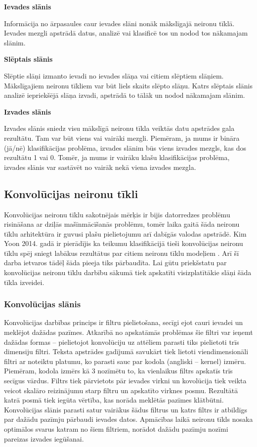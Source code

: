 \textbf{Ievades slānis}

Informācija no ārpasaules caur ievades slāni nonāk mākslīgajā neironu tīklā. Ievades mezgli apstrādā datus, analizē vai klasificē tos un nodod tos nākamajam slānim.

\textbf{Slēptais slānis}

Slēptie slāņi izmanto ievadi no ievades slāņa vai citiem slēptiem slāņiem. Mākslīgajiem neironu tīkliem var būt liels skaits slēpto slāņu. Katrs slēptais slānis analizē iepriekšējā slāņa izvadi, apstrādā to tālāk un nodod nākamajam slānim.

\textbf{Izvades slānis}

Izvades slānis sniedz visu mākslīgā neironu tīkla veiktās datu apstrādes gala rezultātu. Tam var būt viens vai vairāki mezgli. Piemēram, ja mums ir bināra (jā/nē) klasifikācijas problēma, izvades slānim būs viens izvades mezgls, kas dos rezultātu 1 vai 0. Tomēr, ja mums ir vairāku klašu klasifikācijas problēma, izvades slānis var sastāvēt no vairāk nekā viena izvades mezgla.

\subsection{Konvolūcijas neironu tīkli}
Konvolūcijas neironu tīklu sakotnējais mērķis ir bijis datorredzes problēmu risināšana ar dziļās mašīnmācīšanās problēmu, tomēr laika gaitā šāda neironu tīklu arhitektūra ir guvusi plašu pielietojumu arī dabīgās valodas apstrādē. Kim Yoon 2014. gadā ir pierādījis ka teikumu klasifikācijā tieši konvolūcijas neironu tīklu spēj sniegt labākus rezultātus par citiem neironu tīklu modeļiem \cite{kimYoonCNN}. Arī šī darba ietvaros tādēļ šāda pieeja tiks pārbaudīta. Lai gūtu priekšstatu par konvolūcijas neironu tīklu darbību sākumā tiek apskatīti visizplatītākie slāņi šāda tīkla izveidei.

\subsubsection{Konvolūcijas slānis}
Konvolūcijas darbības princips ir filtru pielietošana, secīgi ejot cauri ievadei un meklējot dažādas pazīmes. Atkarībā no apskatāmās problēmas šie filtri var ieņemt dažādas  formas – pielietojot konvolūciju uz attēliem parasti tiks pielietoti trīs dimensiju filtri. Teksta apstrādes gadījumā savukārt tiek lietoti viendimensionāli filtri ar noteiktu platumu, ko parasti sauc par kodola (angliski – kernel) izmēru. Piemēram, kodola izmērs kā 3 nozīmētu to, ka vienlaikus filtrs apskatīs trīs secīgus vārdus. Filtrs tiek pārvietots pār ievades virkni un kovolūcija tiek veikta veicot skalāro reizinājumu starp filtru un apskatīto virknes posmu. Rezultātā katrā posmā tiek iegūta vērtība, kas norāda meklētās pazīmes klātbūtni. Konvolūcijas slānis parasti satur vairākus šādus filtrus un katrs filtrs ir atbildīgs par dažādu pazīmju pārbaudi ievades datos. Apmācības laikā neironu tīkls nosaka optimālos svarus katram no šiem filtriem, norādot dažādu pazīmju nozīmi pareizas izvades iegūšanai.

